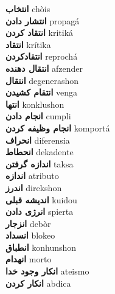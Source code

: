 \textbf{ انتخاب  } chòis \\
\textbf{ انتشار دادن  } propagá \\
\textbf{ انتقاد کردن  } kritiká \\
\textbf{ انتقاد  } krítika \\
\textbf{ انتقادکردن  } reprochá \\
\textbf{ انتقال دهنده  } afzender \\
\textbf{ انتقال  } degenerashon \\
\textbf{ انتقام کشیدن  } venga \\
\textbf{ انتها  } konklushon \\
\textbf{ انجام دادن  } cumpli \\
\textbf{ انجام وظیفه کردن  } komportá \\
\textbf{ انحراف  } diferensia \\
\textbf{ انحطاط  } dekadente \\
\textbf{ اندازه گرفتن  } taksa \\
\textbf{ اندازه  } atributo \\
\textbf{ اندرز  } direkshon \\
\textbf{ اندیشه قبلی  } kuidou \\
\textbf{ انرژی دادن  } spierta \\
\textbf{ انزجار  } debòr \\
\textbf{ انسداد  } blokeo \\
\textbf{ انطباق  } konhunshon \\
\textbf{ انهدام  } morto \\
\textbf{ انکار وجود خدا  } ateismo \\
\textbf{ انکار کردن  } abdica \\

